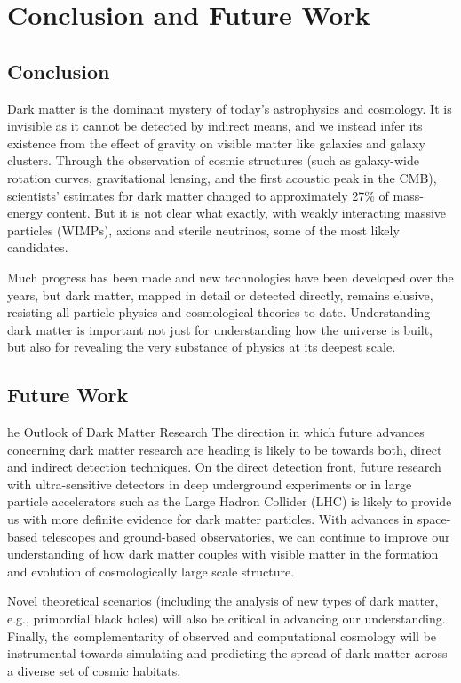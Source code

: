 \chapter{Conclusion and Future Work}

\section{Conclusion}
Dark matter is the dominant mystery of today’s astrophysics and cosmology. It is invisible as it cannot be detected by indirect means, and we instead infer its existence from the effect of gravity on visible matter like galaxies and galaxy clusters. Through the observation of cosmic structures (such as galaxy-wide rotation curves, gravitational lensing, and the first acoustic peak in the CMB), scientists' estimates for dark matter changed to approximately 27\% of mass-energy content. But it is not clear what exactly, with weakly interacting massive particles (WIMPs), axions and sterile neutrinos, some of the most likely candidates.

Much progress has been made and new technologies have been developed over the years, but dark matter, mapped in detail or detected directly, remains elusive, resisting all particle physics and cosmological theories to date. Understanding dark matter is important not just for understanding how the universe is built, but also for revealing the very substance of physics at its deepest scale.

\section{Future Work}

he Outlook of Dark Matter Research The direction in which future advances concerning dark matter research are heading is likely to be towards both, direct and indirect detection techniques. On the direct detection front, future research with ultra-sensitive detectors in deep underground experiments or in large particle accelerators such as the Large Hadron Collider (LHC) is likely to provide us with more definite evidence for dark matter particles. With advances in space-based telescopes and ground-based observatories, we can continue to improve our understanding of how dark matter couples with visible matter in the formation and evolution of cosmologically large scale structure.

Novel theoretical scenarios (including the analysis of new types of dark matter, e.g., primordial black holes) will also be critical in advancing our understanding. Finally, the complementarity of observed and computational cosmology will be instrumental towards simulating and predicting the spread of dark matter across a diverse set of cosmic habitats.


